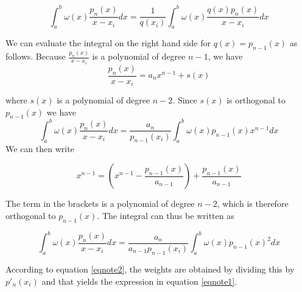 \documentclass[conference,onecolumn,12pt]{IEEEtran}
\theoremstyle{definition}
\begin{document}
 \begin{equation}
     \int_{a}^{b}\omega(x)\frac{p_{n}(x)}{x-x_{i}}dx=\frac{1}{q(x_{i})}\int_{a}^{b}\omega(x)\frac{q(x)p_{n}(x)}{x-x_{i}}dx 
 \end{equation}
   
 We can evaluate the integral on the right hand side for $q(x) = p_{n-1}(x)$ as follows. Because $\frac{p_{n}(x)}{x-x_{i}}$ is a polynomial of degree $n-1$, we have
 \begin{equation}
     \frac{p_{n}(x)}{x-x_{i}} = a_{n}x^{n-1} + s(x)
 \end{equation}

 where $s(x)$ is a polynomial of degree $n - 2$. Since $s(x)$ is orthogonal to $p_{n-1}(x)$ we have
\begin{equation}
 \int_{a}^{b}\omega(x)\frac{p_{n}(x)}{x-x_{i}}dx=\frac{a_{n}}{p_{n-1}(x_{i})}\int_{a}^{b}\omega(x)p_{n-1}(x)x^{n-1}dx
\end{equation}
We can then write

\begin{equation}
    x^{n-1} = \left(x^{n-1} - \frac{p_{n-1}(x)}{a_{n-1}}\right) + \frac{p_{n-1}(x)}{a_{n-1}}
\end{equation}

The term in the brackets is a polynomial of degree $n-2$, which is therefore orthogonal to $p_{n-1}(x)$. The integral can thus be written as

\begin{equation}
    \int_{a}^{b}\omega(x)\frac{p_{n}(x)}{x-x_{i}}dx=\frac{a_{n}}{a_{n-1}p_{n-1}(x_{i})}\int_{a}^{b}\omega(x)p_{n-1}(x)^{2}dx 
\end{equation}

According to equation \ref{eqnote2}, the weights are obtained by dividing this by $p'_{n}(x_{i})$ and that yields the expression in equation \ref{eqnote1}.
\end{document}
